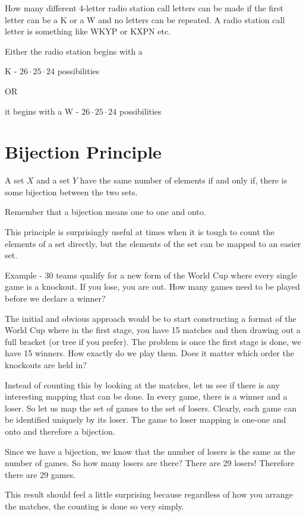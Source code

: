 \documentclass[12pt]{article}
\begin{document}
How many different 4-letter radio station call letters can be made if the first letter can be a K or a W and no letters can be repeated. A radio station call letter is something like WKYP or KXPN etc.

Either the radio station begins with a 

K - $26 \cdot 25 \cdot 24$ possibilities

OR

it begins with a W - $26 \cdot 25 \cdot 24$ possibilities



\section*{Bijection Principle}
A set $X$ and a set $Y$ have the same number of elements if and only if, there is some bijection between the two sets. 

Remember that a bijection means one to one and onto. 

This principle is surprisingly useful at times when it is tough to count the elements of a set directly, but the elements of the set can be mapped to an easier set. 

Example - 30 teams qualify for a new form of the World Cup where every single game is a knockout. If you lose, you are out. How many games need to be played before we declare a winner?

The initial and obvious approach would be to start constructing a format of the World Cup where in the first stage, you have 15 matches and then drawing out a full bracket (or tree if you prefer). The problem is once the first stage is done, we have 15 winners. How exactly do we play them. Does it matter which order the knockouts are held in?

Instead of counting this by looking at the matches, let us see if there is any interesting mapping that can be done. In every game, there is a winner and a loser. So let us map the set of games to the set of losers. Clearly, each game can be identified uniquely by its loser. The game to loser mapping is one-one and onto and therefore a bijection. 

Since we have a bijection, we know that the number of losers is the same as the number of games. So how many losers are there? There are 29 losers! Therefore there are 29 games.

This result should feel a little surprising because regardless of how you arrange the matches, the counting is done so very simply.
\end{document}
